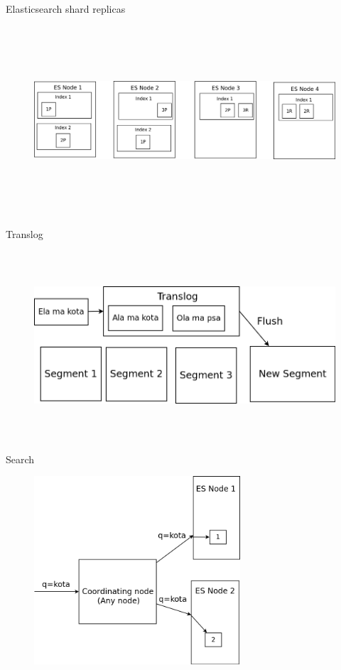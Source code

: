 \documentclass{beamer}
\begin{document}
\begin{frame}{Elasticsearch shard replicas}
	\begin{figure}
		\includegraphics[width=\textwidth,height=7cm,keepaspectratio=true]{elasticsearch-shard-replicas}
	\end{figure}
\end{frame}
\begin{frame}{Translog}
	\begin{figure}
		\includegraphics[width=\textwidth,height=7cm,keepaspectratio=true]{translog}
	\end{figure}
\end{frame}
\begin{frame}{Search}
	\begin{figure}
		\includegraphics[width=\textwidth,height=7cm,keepaspectratio=true]{search1}
	\end{figure}
\end{frame}
\end{document}
